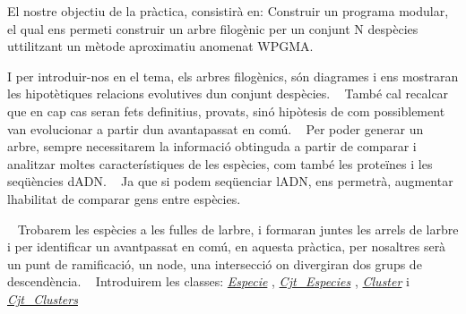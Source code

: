 El nostre objectiu de la pràctica, consistirà en\+: Construir un programa modular, el qual ens permeti construir un arbre filogènic per un conjunt N d\textquotesingle{}espècies uttilitzant un mètode aproximatiu anomenat W\+P\+G\+MA.

I per introduir-\/nos en el tema, els arbres filogènics, són diagrames i ens mostraran les hipotètiques relacions evolutives d\textquotesingle{}un conjunt d\textquotesingle{}espècies. ~\newline
 També cal recalcar que en cap cas seran fets definitius, provats, sinó hipòtesis de com possiblement van evolucionar a partir d\textquotesingle{}un avantapassat en comú. ~\newline
 Per poder generar un arbre, sempre necessitarem la informació obtinguda a partir de comparar i analitzar moltes característiques de les espècies, com també les proteïnes i les seqüències d\textquotesingle{}A\+DN. ~\newline
 Ja que si podem seqüenciar l\textquotesingle{}A\+DN, ens permetrà, augmentar l\textquotesingle{}habilitat de comparar gens entre espècies.

~\newline
 Trobarem les espècies a les fulles de l\textquotesingle{}arbre, i formaran juntes les arrels de l\textquotesingle{}arbre i per identificar un avantpassat en comú, en aquesta pràctica, per nosaltres serà un punt de ramificació, un node, una intersecció on divergiran dos grups de descendència. ~\newline
 Introduirem les classes\+: {\itshape \mbox{\hyperlink{class_especie}{Especie}} }, {\itshape  \mbox{\hyperlink{class_cjt___especies}{Cjt\+\_\+\+Especies}} }, {\itshape  \mbox{\hyperlink{class_cluster}{Cluster}} } i {\itshape  \mbox{\hyperlink{class_cjt___clusters}{Cjt\+\_\+\+Clusters}} } 